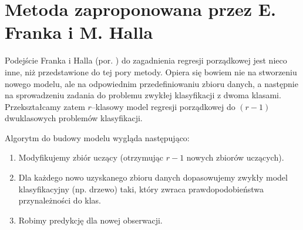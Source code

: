 \documentclass{mini}
\begin{document}
\section{Metoda zaproponowana przez E. Franka i M. Halla}

Podejście Franka i Halla (por. \cite{fh}) do zagadnienia regresji porządkowej jest nieco inne, niż przedstawione do tej pory metody. Opiera się bowiem nie na stworzeniu nowego modelu, ale na odpowiednim przedefiniowaniu zbioru danych, a następnie na sprowadzeniu zadania do problemu zwykłej klasyfikacji z dwoma klasami. Przekształcamy zatem $r$--klasowy model regresji porządkowej do $(r-1)$ dwuklasowych problemów klasyfikacji. 

Algorytm do budowy modelu wygląda następująco:

\begin{enumerate}
\item Modyfikujemy zbiór uczący (otrzymując $r-1$ nowych zbiorów uczących).
\item Dla każdego nowo uzyskanego zbioru danych dopasowujemy zwykły model klasyfikacyjny (np. drzewo) taki, który zwraca prawdopodobieństwa przynależności do klas.
\item Robimy predykcję dla nowej obserwacji. 
\end{enumerate}
\end{document}
